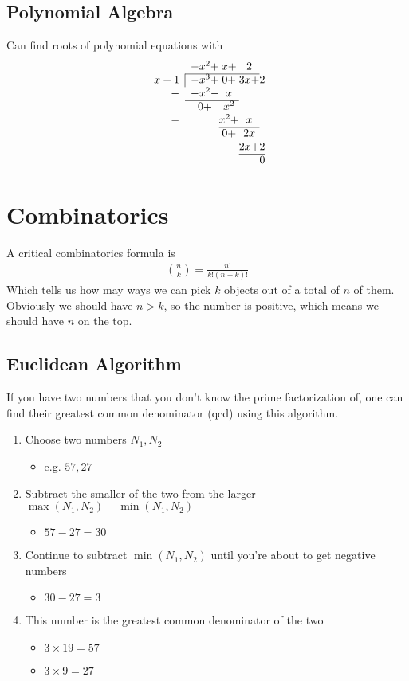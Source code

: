 \subsection{Polynomial Algebra}

Can find roots of polynomial equations with
$$
\begin{array}{rc@{}c@{}c@{}c@{}}
& -x^2 +& x + &2 & \\ \cline{2-4}
\multicolumn{1}{r|}{x+1} &-x^3+ & 0 + & 3x +&2\\
-&-x^2 -&x  &\\ \cline{2-3}
& 0 +& x^2 &\\ 
-&  & x^2 +&x\\ \cline{3-4}
& & 0 +&2x &\\ 
-& &  &2x +&2\\ \cline{4-5}
& & & &0\\
\end{array}
$$

\section{Combinatorics}
A critical combinatorics formula is 
\begin{align}
{{n}\choose{k}} = \frac{n!}{k!(n-k)!}
\end{align}
Which tells us how may ways we can pick $k$ objects out of a total of $n$ of them. Obviously we should have $n>k$, so the number is positive, which means we should have $n$ on the top.


\subsection{Euclidean Algorithm}

If you have two numbers that you don't know the prime factorization of, one can find their greatest common denominator (qcd) using this algorithm. 
\begin{enumerate}
\item Choose two numbers $N_1, N_2$ 
\begin{itemize}
\item	e.g. $57, 27$
\end{itemize}
\item Subtract the smaller of the two from the larger $\max(N_1,N_2) -\min(N_1,N_2)$
\begin{itemize}
\item	$57 -27 = 30$
\end{itemize}
\item Continue to subtract $\min(N_1,N_2)$ until you're about to get negative numbers
\begin{itemize}
\item $30 -27 = 3$
\end{itemize}
\item This number is the greatest common denominator of the two
\begin{itemize}
\item $3\times 19 = 57$
\item $3 \times 9 = 27$
\end{itemize}
\end{enumerate}

